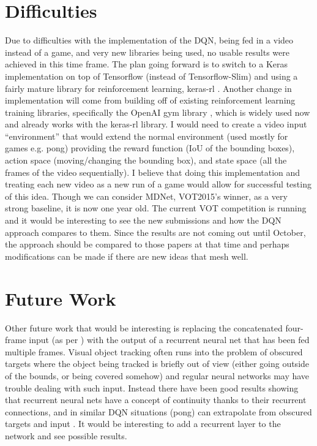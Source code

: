 \documentclass[letterpaper,12pt,titlepage,oneside,final]{book}
\begin{document}
\section{Difficulties}
Due to difficulties with the implementation of the DQN, being fed in a video instead of a game, and very new libraries being used, no usable results were achieved in this time frame. The plan going forward is to switch to a Keras implementation on top of Tensorflow \cite{keras} (instead of Tensorflow-Slim) and using a fairly mature library for reinforcement learning, keras-rl \cite{keras-rl}. Another change in implementation will come from building off of existing reinforcement learning training libraries, specifically the OpenAI gym library \cite{openai-gym}, which is widely used now and already works with the keras-rl library. I would need to create a video input ``environment'' that would extend the normal environment (used mostly for games e.g. pong) providing the reward function (IoU of the bounding boxes), action space (moving/changing the bounding box), and state space (all the frames of the video sequentially). I believe that doing this implementation and treating each new video as a new run of a game would allow for successful testing of this idea.
Though we can consider MDNet, VOT2015's winner, as a very strong baseline, it is now one year old. The current VOT competition is running and it would be interesting to see the new submissions and how the DQN approach compares to them. Since the results are not coming out until October, the approach should be compared to those papers at that time and perhaps modifications can be made if there are new ideas that mesh well.

\section{Future Work}
Other future work that would be interesting is replacing the concatenated four-frame input (as per \cite{atari-dqn}) with the output of a recurrent neural net that has been fed multiple frames. Visual object tracking often runs into the problem of obscured targets where the object being tracked is briefly out of view (either going outside of the bounds, or being covered somehow) and regular neural networks may have trouble dealing with such input. Instead there have been good results showing that recurrent neural nets have a concept of continuity thanks to their recurrent connections, and in similar DQN situations (pong) can extrapolate from obscured targets and input \cite{drqn}. It would be interesting to add a recurrent layer to the network and see possible results.
\end{document}
